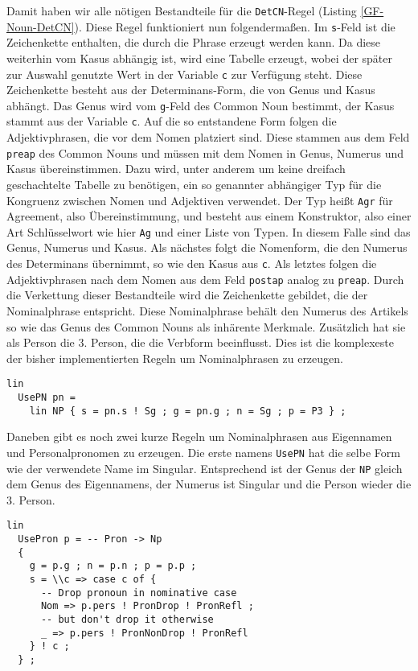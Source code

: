 Damit haben wir alle nötigen Bestandteile für die \texttt{DetCN}-Regel (Listing \ref{GF-Noun-DetCN}). Diese Regel funktioniert nun folgendermaßen. Im \texttt{s}-Feld ist die Zeichenkette enthalten, die durch die Phrase erzeugt werden kann. Da diese weiterhin vom Kasus abhängig ist, wird eine Tabelle erzeugt, wobei der später zur Auswahl genutzte Wert in der Variable \texttt{c} zur Verfügung steht. Diese Zeichenkette besteht aus der Determinans-Form, die von Genus und Kasus abhängt. Das Genus wird vom \texttt{g}-Feld des Common Noun bestimmt, der Kasus stammt aus der Variable \texttt{c}. Auf die so entstandene Form folgen die Adjektivphrasen, die vor dem Nomen platziert sind. Diese stammen aus dem Feld \texttt{preap} des Common Nouns und müssen mit dem Nomen in Genus, Numerus und Kasus übereinstimmen. Dazu wird, unter anderem um keine dreifach geschachtelte Tabelle zu benötigen, ein so genannter abhängiger Typ für die Kongruenz zwischen Nomen und Adjektiven verwendet. Der Typ heißt \texttt{Agr} für Agreement, also Übereinstimmung, und besteht aus einem Konstruktor, also einer Art Schlüsselwort wie hier \texttt{Ag} und einer Liste von Typen. In diesem Falle sind das Genus, Numerus und Kasus.
Als nächstes folgt die Nomenform, die den Numerus des Determinans übernimmt, so wie den Kasus aus \texttt{c}. Als letztes folgen die Adjektivphrasen nach dem Nomen aus dem Feld \texttt{postap} analog zu \texttt{preap}. Durch die Verkettung dieser Bestandteile wird die Zeichenkette gebildet, die der Nominalphrase entspricht. Diese Nominalphrase behält den Numerus des Artikels so wie das Genus des Common Nouns als inhärente Merkmale. Zusätzlich hat sie als Person die 3. Person, die die Verbform beeinflusst. Dies ist die komplexeste der bisher implementierten Regeln um Nominalphrasen zu erzeugen. \par
\begin{lstlisting}[float=h!tp,caption={Die Syntaxregel \texttt{UsePN}, um einen Eigennamen als \texttt{NP} zu verwenden (vgl. \textbf{NounLat.gf}},label={GF-Noun-UsePN}]
lin
  UsePN pn = 
    lin NP { s = pn.s ! Sg ; g = pn.g ; n = Sg ; p = P3 } ;
\end{lstlisting}
Daneben gibt es noch zwei kurze Regeln um Nominalphrasen aus Eigennamen und Personalpronomen zu erzeugen. Die erste namens \texttt{UsePN} hat die selbe Form wie der verwendete Name im Singular. Entsprechend ist der Genus der \texttt{NP} gleich dem Genus des Eigennamens, der Numerus ist Singular und die Person wieder die 3. Person. \par
\begin{lstlisting}[float=h!tp,caption={Die Syntaxregel \texttt{UsePN} um ein Personalpronomen als \texttt{NP} zu verwenden (vgl. \textbf{NounLat.gf})},label={GF-Noun-UsePron}]
lin
  UsePron p = -- Pron -> Np
  { 
    g = p.g ; n = p.n ; p = p.p ;
    s = \\c => case c of { 
      -- Drop pronoun in nominative case
      Nom => p.pers ! PronDrop ! PronRefl ;
      -- but don't drop it otherwise 
      _ => p.pers ! PronNonDrop ! PronRefl 
    } ! c ;
  } ;
\end{lstlisting}
